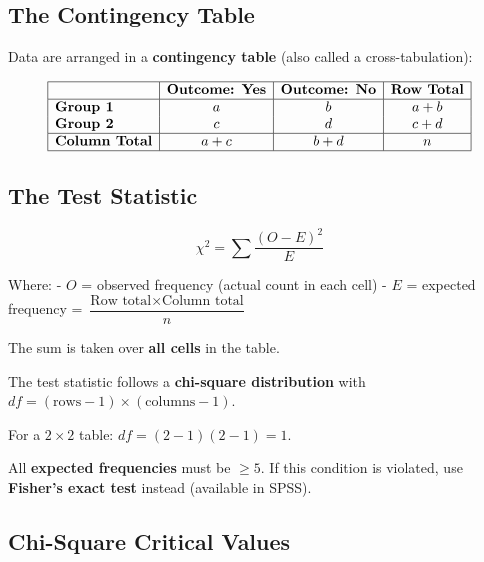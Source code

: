 \documentclass[
  12pt,
  letterpaper,
]{book}
\begin{document}
\subsection{The Contingency Table}\label{the-contingency-table}

Data are arranged in a \textbf{contingency table} (also called a
cross-tabulation):

\[\begin{array}{|l|c|c|c|}
\hline
& \textbf{Outcome: Yes} & \textbf{Outcome: No} & \textbf{Row Total} \\
\hline
\textbf{Group 1} & a & b & a+b \\
\textbf{Group 2} & c & d & c+d \\
\hline
\textbf{Column Total} & a+c & b+d & n \\
\hline
\end{array}\]

\subsection{The Test Statistic}\label{the-test-statistic}

\[\chi^2 = \sum \frac{(O - E)^2}{E}\]

Where: - \(O\) = observed frequency (actual count in each cell) - \(E\)
= expected frequency =
\(\dfrac{\text{Row total} \times \text{Column total}}{n}\)

The sum is taken over \textbf{all cells} in the table.

The test statistic follows a \textbf{chi-square distribution} with
\(df = (\text{rows} - 1) \times (\text{columns} - 1)\).

For a \(2 \times 2\) table: \(df = (2-1)(2-1) = 1\).

\begin{tcolorbox}[enhanced jigsaw, arc=.35mm, bottomrule=.15mm, bottomtitle=1mm, breakable, colback=white, colbacktitle=quarto-callout-warning-color!10!white, colframe=quarto-callout-warning-color-frame, coltitle=black, left=2mm, leftrule=.75mm, opacityback=0, opacitybacktitle=0.6, rightrule=.15mm, title={⚠️ Condition for Valid Chi-Square Test}, titlerule=0mm, toprule=.15mm, toptitle=1mm]

All \textbf{expected frequencies} must be \(\geq 5\). If this condition
is violated, use \textbf{Fisher's exact test} instead (available in
SPSS).

\end{tcolorbox}

\subsection{Chi-Square Critical
Values}\label{chi-square-critical-values}
\end{document}
